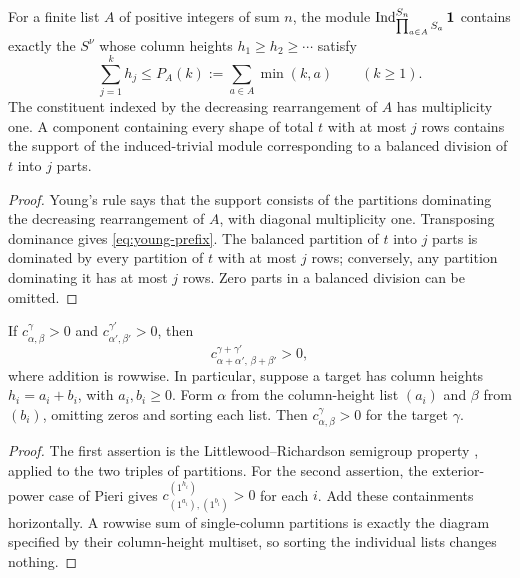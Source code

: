 \begin{lemma}\label{lem:young-support}
For a finite list $A$ of positive integers of sum $n$, the module
$\operatorname{Ind}_{\prod_{a\in A}S_a}^{S_n}\mathbf1$ contains exactly the
$S^\nu$ whose column heights $h_1\ge h_2\ge\cdots$ satisfy
\begin{equation}\label{eq:young-prefix}
 \sum_{j=1}^k h_j\le P_A(k):=\sum_{a\in A}\min(k,a)
 \qquad(k\ge1).
\end{equation}
The constituent indexed by the decreasing rearrangement of $A$
has multiplicity one. A component containing every shape of total
$t$ with at most $j$ rows contains the support of the induced-trivial
module corresponding to a balanced division of $t$ into $j$ parts.
\end{lemma}

\begin{proof}
Young's rule \cite[Rule~14.1]{James} says that the support consists of the partitions
dominating the decreasing rearrangement of $A$, with diagonal
multiplicity one. Transposing dominance gives
\eqref{eq:young-prefix}. The balanced partition of $t$ into $j$ parts
is dominated by every partition of $t$ with at most $j$ rows;
conversely, any partition dominating it has at most $j$ rows.
Zero parts in a balanced division can be omitted.
\end{proof}

\begin{lemma}\label{lem:lr-addition}
If $c_{\alpha,\beta}^{\gamma}>0$ and
$c_{\alpha',\beta'}^{\gamma'}>0$, then
\[
 c_{\alpha+\alpha',\,\beta+\beta'}^{\gamma+\gamma'}>0,
\]
where addition is rowwise. In particular, suppose a target has column
heights $h_i=a_i+b_i$, with $a_i,b_i\ge0$. Form $\alpha$ from the
column-height list $(a_i)$ and $\beta$ from $(b_i)$, omitting zeros
and sorting each list. Then $c_{\alpha,\beta}^{\gamma}>0$ for the
target $\gamma$.
\end{lemma}

\begin{proof}
The first assertion is the Littlewood--Richardson semigroup property
\cite[Theorem~1]{Zelevinsky}, applied to the two triples of partitions.
For the second assertion, the exterior-power case of Pieri gives
$c_{(1^{a_i}),(1^{b_i})}^{(1^{h_i})}>0$ for each $i$.
Add these containments horizontally. A rowwise sum of single-column
partitions is exactly the diagram specified by their column-height
multiset, so sorting the individual lists changes nothing.
\end{proof}

